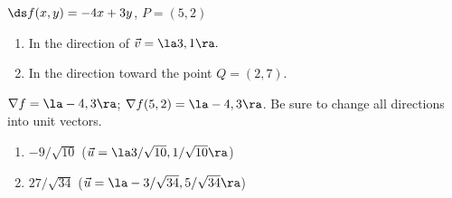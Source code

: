 {$\ds f(x,y) = -4x+3y$, $P = (5,2)$\label{12_05_ex_14}
\begin{enumerate}
	\item In the direction of $\vec v = \la 3,1\ra.$
	\item In the direction toward the point $Q = (2,7)$.
\end{enumerate}
}
{$\nabla f = \la -4,3\ra$; $\nabla f(5,2) = \la -4,3\ra$. Be sure to change all directions into unit vectors.
\begin{enumerate}
	\item $-9/\sqrt{10}$ ($\vec u = \la 3/\sqrt{10},1/\sqrt{10}\ra$)
	\item	$27/\sqrt{34}$ ($\vec u = \la -3/\sqrt{34},5/\sqrt{34}\ra$)
\end{enumerate}
}
